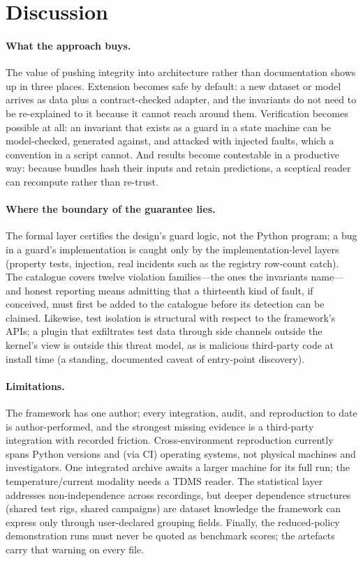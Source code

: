 \section{Discussion}
\label{sec:discussion}

\paragraph{What the approach buys.}
The value of pushing integrity into architecture rather than documentation
shows up in three places. Extension becomes safe by default: a new dataset
or model arrives as data plus a contract-checked adapter, and the invariants
do not need to be re-explained to it because it cannot reach around them.
Verification becomes possible at all: an invariant that exists as a guard in
a state machine can be model-checked, generated against, and attacked with
injected faults, which a convention in a script cannot. And results become
contestable in a productive way: because bundles hash their inputs and
retain predictions, a sceptical reader can recompute rather than re-trust.

\paragraph{Where the boundary of the guarantee lies.}
The formal layer certifies the design's guard logic, not the Python
program; a bug in a guard's implementation is caught only by the
implementation-level layers (property tests, injection, real incidents such
as the registry row-count catch). The catalogue covers twelve violation
families---the ones the invariants name---and honest reporting means
admitting that a thirteenth kind of fault, if conceived, must first be added
to the catalogue before its detection can be claimed. Likewise, test
isolation is structural with respect to the framework's APIs; a plugin that
exfiltrates test data through side channels outside the kernel's view is
outside this threat model, as is malicious third-party code at install time
(a standing, documented caveat of entry-point discovery).

\paragraph{Limitations.}
The framework has one author; every integration, audit, and reproduction to
date is author-performed, and the strongest missing evidence is a
third-party integration with recorded friction. Cross-environment
reproduction currently spans Python versions and (via CI) operating systems,
not physical machines and investigators. One integrated archive awaits a
larger machine for its full run; the temperature/current modality needs a
TDMS reader. The statistical layer addresses non-independence across
recordings, but deeper dependence structures (shared test rigs, shared
campaigns) are dataset knowledge the framework can express only through
user-declared grouping fields. Finally, the reduced-policy demonstration
runs must never be quoted as benchmark scores; the artefacts carry that
warning on every file.

